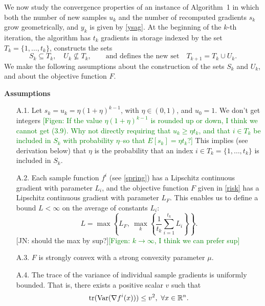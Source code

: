 \documentclass[11pt]{article}
\begin{document}
We now study the convergence properties of an instance of Algorithm~1 in which both the number of new samples $u_k$ and the number of recomputed gradients $s_k$ grow geometrically, and $y_k$ is given by \eqref{ysag}. At the beginning of the $k$-th iteration, the algorithm has $t_k$ gradients in storage indexed by the set $T_k= \{1, \ldots, t_k\}$, constructs the sets
\begin{equation}  \label{capusu}
      S_k \subseteq T_k, \quad U_k \not \subseteq T_k ,\qquad\mbox{and defines the new set} \quad   T_{k+1}= T_k \cup U_k.
\end{equation}
We make the following assumptions about the construction of the sets $S_k$ and $U_k$, and about the objective function $F$.

 
 \bigskip

\noindent\textbf{Assumptions}

\begin{itemize}
 \item[    A.1.] Let $s_k=u_k=\eta (1+\eta)^{k-1}$, with $\eta \in (0,1)$, and $u_0=1$. {\color{red} We don't get integers} \textcolor{green}{[Figen: If the value $\eta (1+\eta)^{k-1}$ is rounded up or down, I think we cannot get (3.9).  Why not directly requiring that $u_k\geq \eta t_k$, and that $i\in T_k$ be included in $S_k$ with probability $\eta$--so that $E[s_k]=\eta t_k$?]} {\color{blue} This implies (see derivation below) that $\eta$ is the probability that an index $i\in T_k =  \{1,\ldots,t_k\}$ is included in $S_k$.}

 \item[    A.2.] Each sample function $f^i$ (see \eqref{spring}) has a Lipschitz continuous gradient with parameter $L_i$, and  the objective function $F$ given in \eqref{risk} has a Lipschitz continuous gradient with parameter $L_F$. This enables us to define a bound $L<\infty$ on the average of constants $L_i$:
 \begin{equation}\label{eq:L}
  L = \max \left\{L_F, \ \max_k \left\{\frac{1}{t_{k}}\sum_{i=1}^{t_k}L_i\right\}\right\}.
 \end{equation}
 {\color{blue}[JN: should the max by sup?]}\textcolor{green}{[Figen: $k\rightarrow \infty$, I think we can prefer sup]}

 \item[    A.3.] $F$ is strongly convex with a strong convexity parameter $\mu$.
 
 \item[    A.4.] The trace of the variance of individual sample gradients is uniformly bounded. That is, there exists a positive scalar $v$ such that
 \[
   \mbox{tr}({\rm Var} (\nabla f^i(x))) \leq v^2, \ \forall x \in \mathbb{R}^n.
 \]

\end{itemize}
\end{document}
